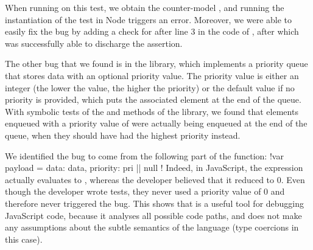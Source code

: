 When running \cosette on this test, we obtain the counter-model , and running the instantiation of the test in Node triggers an error.
Moreover, we were able to easily fix the bug by adding a check for  after line 3 in the code of , after which \cosette was successfully able to discharge the assertion.

The other bug that we found is in the  library, which implements a priority queue that stores data with an optional priority value.
The priority value is either an integer (the lower the value, the higher the priority) or the default  value if no priority is provided, which puts the associated element at the end of the queue.
With symbolic tests of the  and  methods of the library, we found that elements enqueued with a priority value of  were actually being enqueued at the end of the queue, when they should have had the highest priority instead.

We identified the bug to come from the following part of the  function: \jsinline!var payload = { data: data, priority: pri || null }!
Indeed, in JavaScript, the expression  actually evaluates to , whereas the developer believed that it reduced to 0.
Even though the developer wrote tests, they never used a priority value of 0 and therefore never triggered the bug.
This shows that \cosette is a useful tool for debugging JavaScript code, because it analyses all possible code paths, and does not make any assumptions about the subtle semantics of the language (type coercions in this case).






